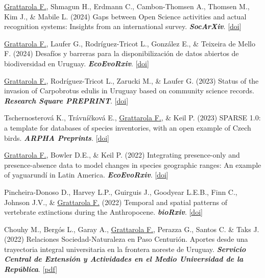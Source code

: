 \documentclass[9pt]{developercv} %
\begin{document}
\begin{etaremune}
\item \underline{Grattarola F.}, Shmagun H., Erdmann C., Cambon-Thomsen A., Thomsen M., Kim J., \& Mabile L. (2024) Gaps between Open Science activities and actual recognition systems: Insights from an international survey. \textit{\textbf{SocArXiv}}. [\href{https://doi.org/10.31235/osf.io/hru2x}{doi}]

\item \underline{Grattarola F.}, Laufer G., Rodríguez-Tricot L., González E., \& Teixeira de Mello F. (2024) Desafíos y barreras para la disponibilización de datos abiertos de biodiversidad en Uruguay. \textit{\textbf{EcoEvoRxiv}}. [\href{https://doi.org/10.32942/X2RK6K}{doi}]

\item \underline{Grattarola F.}, Rodríguez-Tricot L., Zarucki M., \& Laufer G. (2023) Status of the invasion of Carpobrotus edulis in Uruguay based on community science records. \textit{\textbf{Research Square PREPRINT}}. [\href{https://doi.org/10.21203/rs.3.rs-3185397/v1}{doi}]

\item Tschernosterová K., Trávníčková E., \underline{Grattarola F.}, \& Keil P. (2023) SPARSE 1.0: a template for databases of species inventories, with an open example of Czech birds. \textit{\textbf{ARPHA Preprints}}. [\href{https://doi.org/10.3897/arphapreprints.e110098}{doi}]

\item \underline{Grattarola F.}, Bowler D.E., \& Keil P. (2022) Integrating presence-only and presence-absence data to model changes in species geographic ranges: An example of yaguarundí in Latin America. \textit{\textbf{EcoEvoRxiv}}. [\href{https://doi.org/10.32942/osf.io/67c4u}{doi}]

\item Pincheira-Donoso D., Harvey L.P., Guirguis J., Goodyear L.E.B., Finn C., Johnson J.V., \& \underline{Grattarola F.} (2022) Temporal and spatial patterns of vertebrate extinctions during the Anthropocene. \textit{\textbf{bioRxiv}}. [\href{https://doi.org/10.1101/2022.05.05.490605}{doi}]

\end{etaremune}


\begin{etaremune}

\item Chouhy M., Bergós L., Garay A., \underline{Grattarola F.}, Perazza G., Santos C. \& Taks J. (2022) Relaciones Sociedad-Naturaleza en Paso Centurión. Aportes desde una trayectoria integral universitaria en la frontera noreste de Uruguay. \textit{\textbf{Servicio Central de Extensión y Actividades en el Medio Universidad de la República}}. [\href{https://udelar.edu.uy/retema/wp-content/uploads/sites/30/2022/09/relaciones_sociedad-naturaleza_en_paso_centurion-comprimido-1.pdf}{pdf}]

\end{etaremune}
\end{document}
